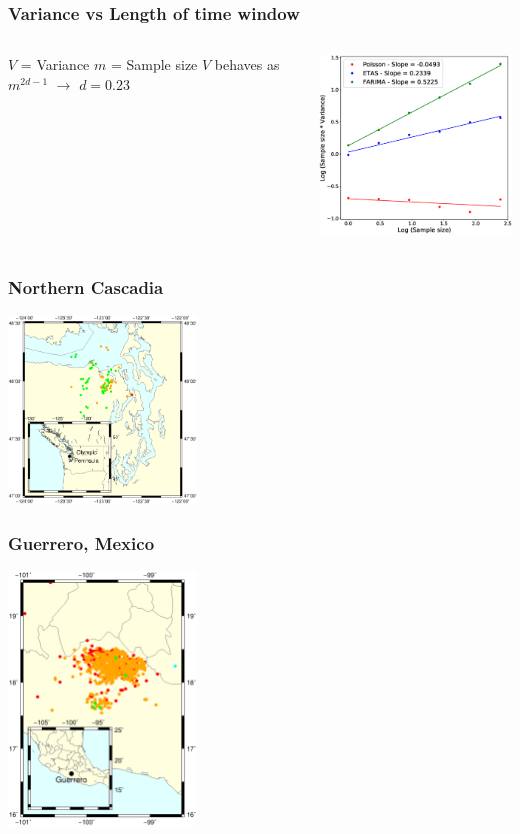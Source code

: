 \documentclass{beamer}
\begin{document}
	\begin{frame}
		\frametitle{Variance vs Length of time window}
		\begin{columns}[c]
			\begin{column}{5cm}
				$V$ = Variance
				$m$ = Sample size
				$V$ behaves as $m^{2 d - 1}$
				$\rightarrow$ $d =  0.23$
			\end{column}
			\begin{column}{7cm}
				\begin{center}
					\includegraphics[width=7cm, trim={0cm 0cm 0cm 0cm}, clip]{other/comparison.eps}
				\end{center}
			\end{column}
		\end{columns}
	\end{frame}

	\begin{frame}
		\frametitle{Northern Cascadia}
		\begin{center}
			\includegraphics[width=5cm, trim={1cm 2cm 2cm 2cm}, clip]{other/cascadia.eps}
		\end{center}
	\end{frame}

	\begin{frame}
		\frametitle{Guerrero, Mexico}
		\begin{center}
			\includegraphics[width=5cm, trim={1cm 2cm 6cm 8cm}, clip]{other/guerrero.eps}
		\end{center}
	\end{frame}
\end{document}
